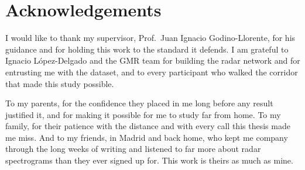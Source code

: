 \chapter*{Acknowledgements}
I would like to thank my supervisor, Prof.~Juan Ignacio Godino-Llorente,
for his guidance and for holding this work to the standard it defends. I am
grateful to Ignacio López-Delgado and the GMR team for building the radar
network and for entrusting me with the dataset, and to every participant
who walked the corridor that made this study possible.

To my parents, for the confidence they placed in me long before any result
justified it, and for making it possible for me to study far from home. To
my family, for their patience with the distance and with every call this
thesis made me miss. And to my friends, in Madrid and back home, who kept
me company through the long weeks of writing and listened to far more about
radar spectrograms than they ever signed up for. This work is theirs as
much as mine.
